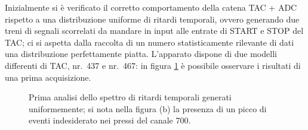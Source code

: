 \documentclass[11pt, oneside, a4paper]{article}   	%
\begin{document}
Inizialmente si è verificato il corretto comportamento della catena TAC + ADC rispetto a una distribuzione uniforme di ritardi temporali, ovvero generando due treni di segnali scorrelati da mandare in input alle entrate di START e STOP del TAC; ci si aspetta dalla raccolta di un numero statisticamente rilevante di dati una distribuzione perfettamente piatta. L'apparato dispone di due modelli differenti di TAC, nr.~437 e nr.~467: in figura \ref{rumore1} è possibile osservare i risultati di una prima acquisizione.
%
\begin{figure}[h]
	\centerline{
		}
		\caption{Prima analisi dello spettro di ritardi temporali generati uniformemente; si nota nella figura (b) la presenza di un picco di eventi indesiderato nei pressi del canale 700.}
		\label{rumore1}
\end{figure}
%
\end{document}
